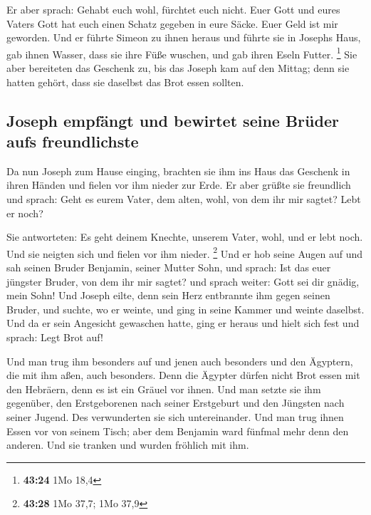  Er aber sprach: Gehabt euch wohl, fürchtet euch nicht.
Euer Gott und eures Vaters Gott hat euch einen Schatz gegeben in eure
Säcke. Euer Geld ist mir geworden. Und er führte Simeon zu ihnen heraus
 und führte sie in Josephs Haus, gab ihnen Wasser, dass
sie ihre Füße wuschen, und gab ihren Eseln Futter. \footnote{\textbf{43:24}
  1Mo 18,4}  Sie aber bereiteten das Geschenk zu, bis das
Joseph kam auf den Mittag; denn sie hatten gehört, dass sie daselbst das
Brot essen sollten.

\hypertarget{joseph-empfuxe4ngt-und-bewirtet-seine-bruxfcder-aufs-freundlichste}{%
\subsection{Joseph empfängt und bewirtet seine Brüder aufs
freundlichste}\label{joseph-empfuxe4ngt-und-bewirtet-seine-bruxfcder-aufs-freundlichste}}

 Da nun Joseph zum Hause einging, brachten sie ihm ins
Haus das Geschenk in ihren Händen und fielen vor ihm nieder zur Erde.
 Er aber grüßte sie freundlich und sprach: Geht es eurem
Vater, dem alten, wohl, von dem ihr mir sagtet? Lebt er noch?

 Sie antworteten: Es geht deinem Knechte, unserem Vater,
wohl, und er lebt noch. Und sie neigten sich und fielen vor ihm nieder.
\footnote{\textbf{43:28} 1Mo 37,7; 1Mo 37,9}  Und er hob
seine Augen auf und sah seinen Bruder Benjamin, seiner Mutter Sohn, und
sprach: Ist das euer jüngster Bruder, von dem ihr mir sagtet? und sprach
weiter: Gott sei dir gnädig, mein Sohn!  Und Joseph
eilte, denn sein Herz entbrannte ihm gegen seinen Bruder, und suchte, wo
er weinte, und ging in seine Kammer und weinte daselbst. 
Und da er sein Angesicht gewaschen hatte, ging er heraus und hielt sich
fest und sprach: Legt Brot auf!

 Und man trug ihm besonders auf und jenen auch besonders
und den Ägyptern, die mit ihm aßen, auch besonders. Denn die Ägypter
dürfen nicht Brot essen mit den Hebräern, denn es ist ein Gräuel vor
ihnen.  Und man setzte sie ihm gegenüber, den
Erstgeborenen nach seiner Erstgeburt und den Jüngsten nach seiner
Jugend. Des verwunderten sie sich untereinander.  Und man
trug ihnen Essen vor von seinem Tisch; aber dem Benjamin ward fünfmal
mehr denn den anderen. Und sie tranken und wurden fröhlich mit ihm.

